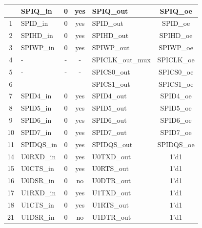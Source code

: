 \begin{longtable}[c]{|c|l|c|c|l|c|}
    \endlastfoot
 0  &                 SPIQ\_in  &  0  &  yes  &               SPIQ\_out  &           SPIQ\_oe  \\\hline
  1  &                 SPID\_in  &  0  &  yes  &               SPID\_out  &           SPID\_oe  \\\hline
  2  &                SPIHD\_in  &  0  &  yes  &              SPIHD\_out  &          SPIHD\_oe  \\\hline
  3  &                SPIWP\_in  &  0  &  yes  &              SPIWP\_out  &          SPIWP\_oe  \\\hline
  4  &                        -  &  -  &    -  &        SPICLK\_out\_mux  &         SPICLK\_oe  \\\hline
  5  &                        -  &  -  &    -  &             SPICS0\_out  &         SPICS0\_oe  \\\hline
  6  &                        -  &  -  &    -  &             SPICS1\_out  &         SPICS1\_oe  \\\hline
  7  &                SPID4\_in  &  0  &  yes  &              SPID4\_out  &          SPID4\_oe  \\\hline
  8  &                SPID5\_in  &  0  &  yes  &              SPID5\_out  &          SPID5\_oe  \\\hline
  9  &                SPID6\_in  &  0  &  yes  &              SPID6\_out  &          SPID6\_oe  \\\hline
 10  &                SPID7\_in  &  0  &  yes  &              SPID7\_out  &          SPID7\_oe  \\\hline
 11  &               SPIDQS\_in  &  0  &  yes  &             SPIDQS\_out  &         SPIDQS\_oe  \\\hline
 14  &                U0RXD\_in  &  0  &  yes  &              U0TXD\_out  &               1'd1  \\\hline
 15  &                U0CTS\_in  &  0  &  yes  &              U0RTS\_out  &               1'd1  \\\hline
 16  &                U0DSR\_in  &  0  &   no  &              U0DTR\_out  &               1'd1  \\\hline
 17  &                U1RXD\_in  &  0  &  yes  &              U1TXD\_out  &               1'd1  \\\hline
 18  &                U1CTS\_in  &  0  &  yes  &              U1RTS\_out  &               1'd1  \\\hline
 21  &                U1DSR\_in  &  0  &   no  &              U1DTR\_out  &               1'd1  \\\hline

\end{longtable}
